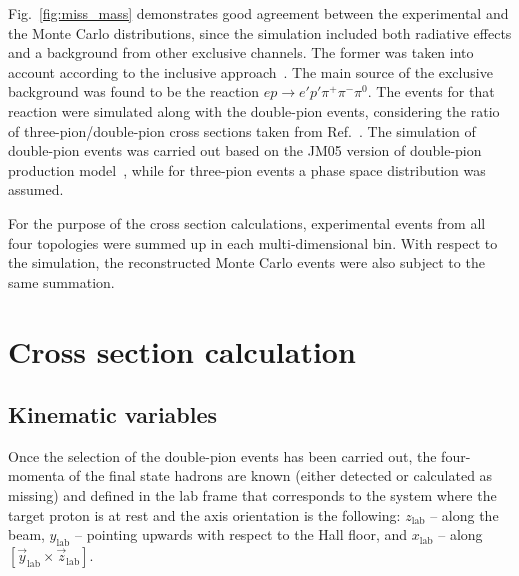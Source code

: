 \documentclass[prc,twocolumn,superscriptaddress,showpacs,amssymb,amsmath,amsfonts,aps,nofootinbib]{revtex4-1}
\begin{document}
 
Fig.~\ref{fig:miss_mass} demonstrates good agreement between the experimental and the Monte Carlo distributions,  since the simulation included both radiative effects and a background from other exclusive channels. 
The former was taken into account according to the inclusive approach~\cite{Mo:1968cg}. 
The main source of the exclusive background was found to be the reaction $e p \rightarrow e' p' \pi^{+} \pi^{-} \pi^{0}$. The events for that reaction were simulated along  with the double-pion events, 
considering the ratio of three-pion/double-pion cross sections
 taken from Ref.~\cite{Wu:2005wf}. The simulation of double-pion events was carried out based on the JM05 version of double-pion production model~\cite{Ripani:2000va,Aznauryan:2005tp,Mokeev:2005re}, while for three-pion events a phase space distribution was assumed. 
 
For the purpose of the cross section calculations, experimental events from all four topologies were summed up in each multi-dimensional bin. With respect to the simulation, the reconstructed Monte Carlo events were also subject to the same summation.

































\section{Cross section calculation}

\subsection{Kinematic variables}
\label{sec_kin_var}

Once the selection of the double-pion events has been carried out, the four-momenta of the final state hadrons are known (either detected or calculated as missing) and defined in the lab frame that corresponds to the system where the target proton is at rest and the axis orientation is the following: $z_{\text{lab}}$ -- along the beam, $y_{\text{lab}}$ -- pointing upwards with respect to the Hall floor, and $x_{\text{lab}}$ -- along $[\vec y_{\text{lab}} \times \vec z_{\text{lab}}]$.
\end{document}
